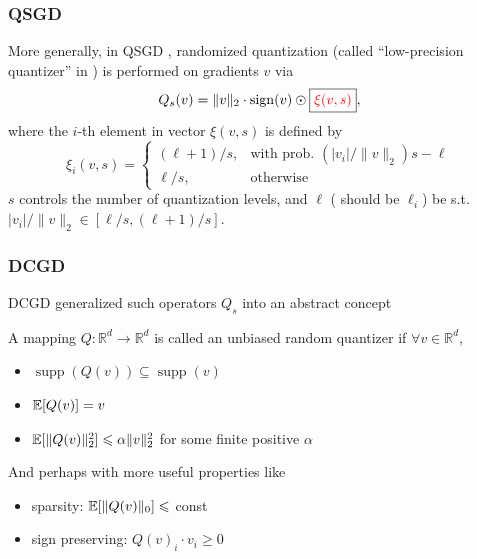 
\begin{frame}
\frametitle{QSGD}

More generally, in QSGD \cite{alistarh2017qsgd}, randomized quantization (called ``low-precision quantizer'' in \cite{khirirat2018dcgd}) is performed on gradients $v$ via
$$Q_s(v) = \lVert v \rVert_2 \cdot \operatorname{sign}(v) \odot \framebox{\color{red}$\xi(v,s)$},$$
where the $i$-th element in vector $\xi(v,s)$ is defined by
\begin{equation*}
    \xi_i(v,s) = \begin{cases}
    (\ell+1)/s, & \text{with prob. } (|v_i|/\lVert v \rVert_2) s - \ell \\
    \ell/s, & \text{otherwise}
    \end{cases}
\end{equation*}
$s$ controls the number of quantization levels, and $\ell$ ({\color{red} should be $\ell_i$}) be s.t. $|v_i|/\lVert v \rVert_2 \in [\ell/s, (\ell+1)/s]$.


\end{frame}


\begin{frame}
\frametitle{DCGD}

DCGD \cite{khirirat2018dcgd} generalized such operators $Q_s$ into an abstract concept

\begin{Def}
A mapping $Q:\mathbb{R}^d \to \mathbb{R}^d$ is called an unbiased random quantizer if $\forall v \in \mathbb{R}^d$,
\begin{itemize}
    \item $\operatorname{supp}(Q(v)) \subseteq \operatorname{supp}(v)$
    \item $\operatorname*{\mathbb{E}} [Q(v)] = v$
    \item $\operatorname*{\mathbb{E}} [\lVert Q(v) \rVert_2^2] \leqslant \alpha \lVert v \rVert_2^2$ for some finite positive $\alpha$
\end{itemize}
\end{Def}

And perhaps with more useful properties like
\begin{itemize}
    \item sparsity: $\operatorname*{\mathbb{E}} [\lVert Q(v) \rVert_0] \leqslant$ const
    \item sign preserving: $Q(v)_i \cdot v_i \geqslant 0$
\end{itemize}


\end{frame}

